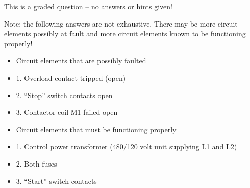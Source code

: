 \vfil 

\eject






This is a graded question -- no answers or hints given!







Note: the following answers are not exhaustive.  There may be more circuit elements possibly at fault and more circuit elements known to be functioning properly!

\begin{itemize}
\item{} Circuit elements that are possibly faulted
\item{1.} Overload contact tripped (open)
\item{2.} ``Stop'' switch contacts open
\item{3.} Contactor coil M1 failed open
\end{itemize}

\begin{itemize}
\item{} Circuit elements that must be functioning properly
\item{1.} Control power transformer (480/120 volt unit supplying L1 and L2)
\item{2.} Both fuses
\item{3.} ``Start'' switch contacts
\end{itemize}




